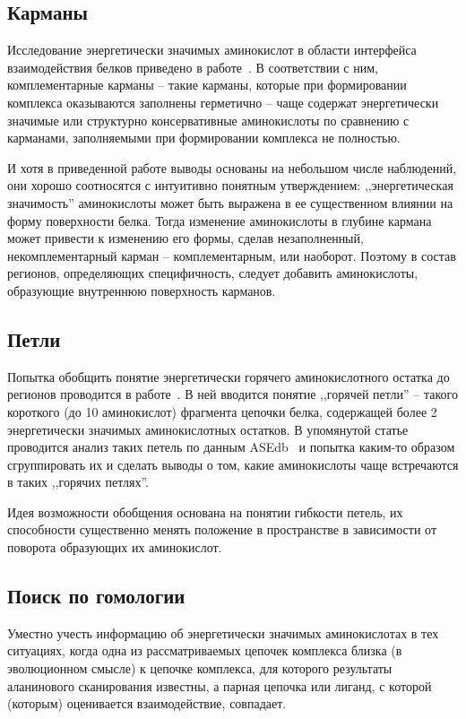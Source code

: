 \subsection{Карманы}
Исследование энергетически значимых аминокислот в области интерфейса взаимодействия белков приведено в работе~\cite{pockets2004}. В соответствии с ним, комплементарные карманы -- такие карманы, которые при формировании комплекса оказываются заполнены герметично -- чаще содержат энергетически значимые или структурно консервативные аминокислоты по сравнению с карманами, заполняемыми при формировании комплекса не полностью.

И хотя в приведенной работе выводы основаны на небольшом числе наблюдений, они хорошо соотносятся с интуитивно понятным утверждением: ,,энергетическая значимость'' аминокислоты может быть выражена в ее существенном влиянии на форму поверхности белка. Тогда изменение аминокислоты в глубине кармана может привести к изменению его формы, сделав незаполненный, некомплементарный карман -- комплементарным, или наоборот. Поэтому в состав регионов, определяющих специфичность, следует добавить аминокислоты, образующие внутреннюю поверхность карманов.
\subsection{Петли}
Попытка обобщить понятие энергетически горячего аминокислотного остатка до регионов проводится в работе~\cite{loops2014}. В ней вводится понятие ,,горячей петли'' -- такого короткого (до 10 аминокислот) фрагмента  цепочки белка, содержащей более 2 энергетически значимых аминокислотных остатков. В упомянутой статье проводится анализ таких петель по данным ASEdb~\cite{asedb2001} и попытка каким-то образом сгруппировать их и сделать выводы о том, какие аминокислоты чаще встречаются в таких ,,горячих петлях''.

Идея возможности обобщения основана на понятии гибкости петель, их способности существенно менять положение в пространстве в зависимости от поворота образующих их аминокислот.

\subsection{Поиск по гомологии}
Уместно учесть информацию об энергетически значимых аминокислотах в тех ситуациях, когда одна из рассматриваемых цепочек комплекса близка (в эволюционном смысле) к цепочке комплекса, для которого результаты аланинового сканирования известны, а парная цепочка или лиганд, с которой (которым) оценивается взаимодействие, совпадает.

